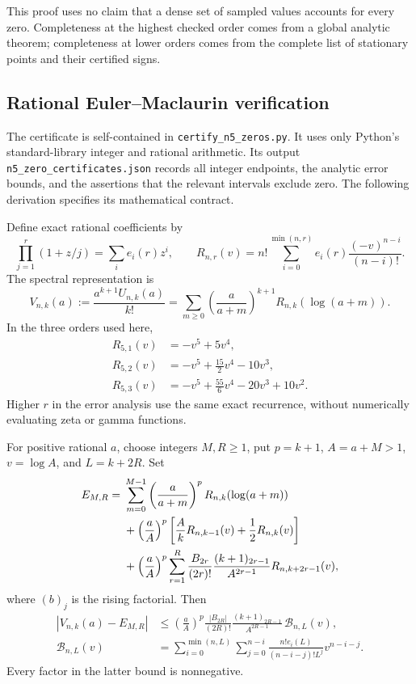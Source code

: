 This proof uses no claim that a dense set of sampled values accounts for
every zero.  Completeness at the highest checked order comes from a
global analytic theorem; completeness at lower orders comes from the
complete list of stationary points and their certified signs.

\subsection{Rational Euler--Maclaurin verification}

The certificate is self-contained in
\texttt{certify\_n5\_zeros.py}.  It uses only Python's standard-library
integer and rational arithmetic.  Its output
\texttt{n5\_zero\_certificates.json} records all integer endpoints,
the analytic error bounds, and the assertions that the relevant
intervals exclude zero.  The following derivation specifies its
mathematical contract.

Define exact rational coefficients by
\[
 \prod_{j=1}^{r}(1+z/j)=\sum_i e_i(r)z^i,
 \qquad
 R_{n,r}(v)=n!\sum_{i=0}^{\min(n,r)}
                  e_i(r)\frac{(-v)^{n-i}}{(n-i)!}.
\]
The spectral representation is
\begin{equation}\label{n5:eq:spectral}
 V_{n,k}(a):=\frac{a^{k+1}U_{n,k}(a)}{k!}
   =\sum_{m\geq0}\left(\frac a{a+m}\right)^{k+1}
             R_{n,k}(\log(a+m)).
\end{equation}
In the three orders used here,
\begin{align*}
 R_{5,1}(v)&=-v^5+5v^4,\\
 R_{5,2}(v)&=-v^5+\frac{15}{2}v^4-10v^3,\\
 R_{5,3}(v)&=-v^5+\frac{55}{6}v^4-20v^3+10v^2.
\end{align*}
Higher $r$ in the error analysis use the same exact recurrence, without
numerically evaluating zeta or gamma functions.

For positive rational $a$, choose integers $M,R\geq1$, put $p=k+1$,
$A=a+M>1$, $v=\log A$, and $L=k+2R$.  Set
\begin{align}
 E_{M,R}={}&\sum_{m=0}^{M-1}
       \left(\frac a{a+m}\right)^pR_{n,k}(\log(a+m))\notag\\
 &+\left(\frac aA\right)^p
       \left[\frac Ak R_{n,k-1}(v)+\frac12R_{n,k}(v)\right]\notag\\
 &+\left(\frac aA\right)^p\sum_{r=1}^{R}
    \frac{B_{2r}}{(2r)!}\frac{(k+1)_{2r-1}}{A^{2r-1}}
       R_{n,k+2r-1}(v),\label{n5:eq:EM}
\end{align}
where $(b)_j$ is the rising factorial.  Then
\begin{align}
 |V_{n,k}(a)-E_{M,R}|&\leq
 \left(\frac aA\right)^p\frac{|B_{2R}|}{(2R)!}
       \frac{(k+1)_{2R-1}}{A^{2R-1}}\,\mathcal B_{n,L}(v),
       \label{n5:eq:EM-error}\\
 \mathcal B_{n,L}(v)&=
 \sum_{i=0}^{\min(n,L)}\sum_{j=0}^{n-i}
       \frac{n!e_i(L)}{(n-i-j)!L^j}v^{n-i-j}.
       \label{n5:eq:EM-majorant}
\end{align}
Every factor in the latter bound is nonnegative.

